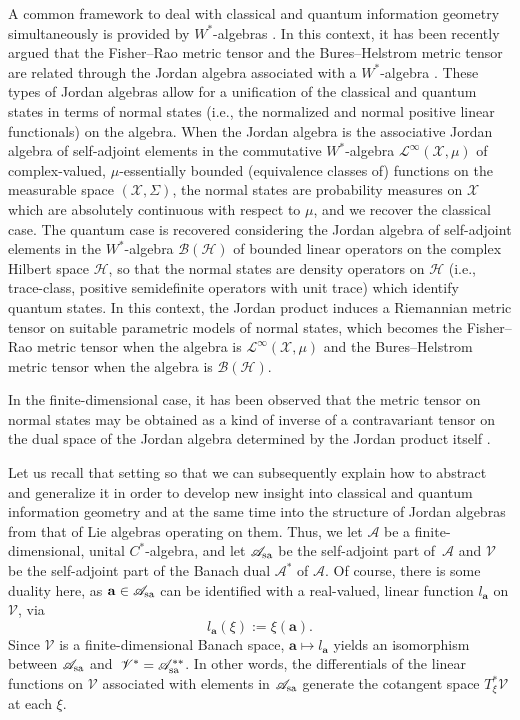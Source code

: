 \documentclass[10pt,a4paper]{amsart}
\numberwithin{equation}{section}
\newcommand{\appa}{\mathscr{A}}
\newcommand{\appas}{\mathscr{A}_{\rm sa}}
\newcommand{\stav}{\mathscr{V}}
\begin{document}
A common framework to deal with classical and quantum information geometry simultaneously is provided by $W^*$-algebras \cite{C-J-S-2020-02,C-J-S-2020,C-DN-J-S-2023,Jencova-2003,Jencova-2006,Kostecki-2011}.
In this context, it has been recently argued that the Fisher--Rao metric tensor and the Bures--Helstrom metric tensor are related through the Jordan algebra associated with a $W^{*}$-algebra \cite{C-J-S-2020-02,C-J-S-2020, C-DN-J-S-2023}.
These types of Jordan algebras allow for a unification of the classical and quantum states in terms of normal states (i.e., the normalized and normal positive linear functionals) on the algebra.
When the Jordan algebra is the associative Jordan algebra of self-adjoint elements in the commutative $W^{*}$-algebra $\mathcal{L}^{\infty}(\mathcal{X},\mu)$ of complex-valued, $\mu$-essentially bounded (equivalence classes of) functions on the measurable space $(\mathcal{X},\Sigma)$, the normal states are probability measures on $\mathcal{X}$ which are absolutely continuous with respect to $\mu$, and we recover the classical case.
The quantum case is recovered considering the Jordan algebra of self-adjoint elements in the $W^{*}$-algebra $\mathcal{B}(\mathcal{H})$ of bounded linear operators on the complex Hilbert space $\mathcal{H}$, so that the normal states are density operators on $\mathcal{H}$ (i.e., trace-class, positive semidefinite operators with unit trace) which identify quantum states.
In this context, the Jordan product induces a Riemannian metric tensor on suitable parametric models of normal states, which becomes the Fisher--Rao metric tensor when the algebra is $\mathcal{L}^{\infty}(\mathcal{X},\mu)$ and the Bures--Helstrom metric tensor when the algebra is $\mathcal{B}(\mathcal{H})$.


In the finite-dimensional case, it has been observed that the metric tensor on normal states may be obtained as a kind of inverse of a contravariant tensor on the dual space of the Jordan algebra determined by the Jordan product itself \cite{C-J-S-2020}.

Let us recall that setting so that we can subsequently explain how to abstract and generalize it in order to develop new insight into classical and quantum information geometry and at the same time into the structure of Jordan algebras from that of Lie algebras operating on them.
Thus, we let $\appa$ be a finite-dimensional, unital $C^{*}$-algebra, and let $\appas$ be the self-adjoint part of~$\appa$ and $\stav$ be the self-adjoint part of the Banach dual $\appa^{*}$ of $\appa$.
 Of course, there is some duality here, as $\mathbf{a}\in\appas$ can be identified with a real-valued, linear function $l_{\mathbf{a}}$ on $\stav$, via
\[
l_{\mathbf{a}}(\xi) := \xi(\mathbf{a}).
\]
Since $\stav$ is a finite-dimensional Banach space, $\mathbf{a}\mapsto l_{\mathbf{a}}$ yields an isomorphism between $\appas$ and~$\stav^{*}=\appas^{**}$. In other words, the differentials of the linear functions on $\stav$ associated with elements in $\appas$ generate the cotangent space $T_{\xi}^{*}\stav$ at each $\xi$.
\end{document}

